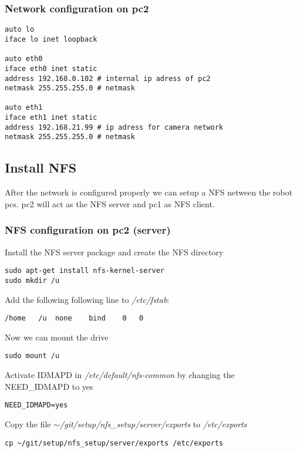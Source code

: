 \subsubsection{Network configuration on pc2}

\begin{lstlisting} 
auto lo
iface lo inet loopback

auto eth0
iface eth0 inet static
address 192.168.0.102 # internal ip adress of pc2
netmask 255.255.255.0 # netmask

auto eth1
iface eth1 inet static
address 192.168.21.99 # ip adress for camera network
netmask 255.255.255.0 # netmask
\end{lstlisting}

\subsection{Install NFS}
After the network is configured properly we can setup a NFS netween the robot pcs. pc2 will act as the NFS server and pc1 as NFS client.

\subsubsection{NFS configuration on pc2 (server)}
Install the NFS server package and create the NFS directory

\begin{lstlisting}
sudo apt-get install nfs-kernel-server
sudo mkdir /u 
\end{lstlisting}

Add the following following line to \textit{/etc/fstab}:

\begin{lstlisting}
/home	/u	none	bind	0	0
\end{lstlisting}

Now we can mount the drive

\begin{lstlisting}
sudo mount /u
\end{lstlisting}

Activate IDMAPD in \textit{/etc/default/nfs-common} by changing the NEED\_IDMAPD to yes

\begin{lstlisting}
NEED_IDMAPD=yes
\end{lstlisting}

Copy the file \textit{$\sim$/git/setup/nfs\_setup/server/exports} to \textit{/etc/exports}

\begin{lstlisting}
cp ~/git/setup/nfs_setup/server/exports /etc/exports
\end{lstlisting}

